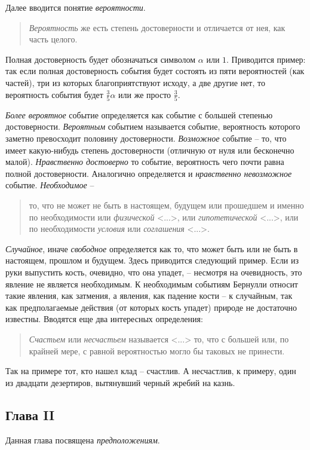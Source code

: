 \documentclass[12pt]{extarticle}
\begin{document}
Далее вводится понятие \textit{вероятности}.
\begin{quote}
\textit{Вероятность} же есть степень достоверности и отличается от нея, как часть целого.
\end{quote}
Полная достоверность будет обозначаться символом $\alpha$ или $1$. 
Приводится пример: так если полная достоверность события будет состоять из пяти вероятностей (как частей), три из которых благоприятствуют исходу, а две другие нет, то вероятность события будет $\frac{3}{5} \alpha$ или же просто $\frac{3}{5}$.

\textit{Более вероятное} событие определяется как событие с большей степенью достоверности.
\textit{Вероятным} событием называется событие, вероятность которого заметно превосходит половину достоверности.
\textit{Возможное} событие -- то, что имеет какую-нибудь степень достоверности (отличную от нуля или бесконечно малой).
\textit{Нравственно достоверно} то событие, вероятность чего почти равна полной достоверности. 
Аналогично определяется и \textit{нравственно невозможное} событие.
\textit{Необходимое} -- 
\begin{quote}
то, что не может не быть в настоящем, будущем или прошедшем и именно по необходимости или \textit{физической} <...>, или \textit{гипотетической} <...>, или по необходимости \textit{условия} или \textit{соглашения} <...>.
\end{quote}
\textit{Случайное}, иначе \textit{свободное} определяется как то, что может быть или не быть в настоящем, прошлом и будущем.
Здесь приводится следующий пример. Если из руки выпустить кость, очевидно, что она упадет, -- несмотря на очевидность, это явление не является необходимым. 
К необходимым событиям Бернулли относит такие явления, как затмения, а явления, как падение кости -- к случайным, так как предполагаемые действия (от которых кость упадет) природе не достаточно известны.
Вводятся еще два интересных определения:
\begin{quote}
\textit{Счастьем} или \textit{несчастьем} называется <...> то, что с большей или, по крайней мере, с равной вероятностью могло бы таковых не принести.
\end{quote}
Так на примере тот, кто нашел клад -- счастлив. 
А несчастлив, к примеру, один из двадцати дезертиров, вытянувший черный жребий на казнь.

\subsection{Глава II}
Данная глава посвящена \textit{предположениям}.
\end{document}
